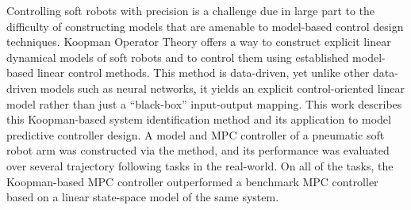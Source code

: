 Controlling soft robots with precision is a challenge due in large part to the difficulty of constructing models that are amenable to model-based control design techniques.
Koopman Operator Theory offers a way to construct explicit linear dynamical models of soft robots and to control them using established model-based linear control methods.
This method is data-driven, yet unlike other data-driven models such as neural networks, it yields an explicit control-oriented linear model rather than just a ``black-box'' input-output mapping.
This work describes this Koopman-based system identification method and its application to model predictive controller design.
A model and MPC controller of a pneumatic soft robot arm was constructed via the method, and its performance was evaluated over several trajectory following tasks in the real-world. 
On all of the tasks, the Koopman-based MPC controller outperformed a benchmark MPC controller based on a linear state-space model of the same system.